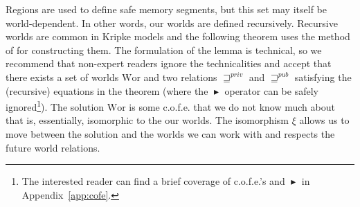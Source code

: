 \documentclass[format=acmsmall, review=true, screen=true]{acmart}
\newcommand{\blater}{\mathop{\blacktriangleright}}
\newcommand{\cofe}{c.o.f.e.}
\newcommand{\var}[1]{\mathit{#1}}
\newcommand{\futurewk}{\mathbin{\sqsupseteq}^{\var{pub}}}
\newcommand{\futurestr}{\mathbin{\sqsupseteq}^{\var{priv}}}
\newcommand{\plaindom}[1]{\mathrm{#1}}
\newcommand{\Wor}{\plaindom{Wor}}
\newenvironment{toplas}{}{}
\begin{document}
Regions are used to define safe memory segments, but this set may itself be world-dependent.
In other words, our worlds are defined recursively.
Recursive worlds are common in Kripke models and the following theorem uses the method of \citet{Birkedal:2011:SKM:1926385.1926401,Birkedal:tutorial-notes} for constructing them.
The formulation of the lemma is technical, so we recommend that non-expert readers ignore the technicalities and accept that there exists a set of worlds $\Wor$ and two relations $\futurestr$ and $\futurewk$ satisfying the (recursive) equations in the theorem (where the $\blater$ operator can be safely ignored\footnote{The interested reader can find a brief coverage of \cofe{}'s and $\blater$ in Appendix~\ref{app:cofe}.}).
\begin{toplas}
The solution $\Wor$ is some \cofe{} that we do not know much about that is, essentially, isomorphic to the our worlds.
The isomorphism $\xi$ allows us to move between the solution and the worlds we can work with and respects the future world relations.
\end{toplas}
\end{document}
